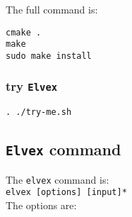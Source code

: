 \documentclass[11pt]{article}
\begin{document}
The full command is:

\begin{lstlisting}[frame=none, numbers=none]
cmake .
make
sudo make install
\end{lstlisting}

\subsubsection{try \texttt{Elvex}}

\begin{lstlisting}[frame=none, numbers=none]
. ./try-me.sh
\end{lstlisting}

\subsection{\texttt{Elvex} command}

The \texttt{elvex} command is:\\

\noindent
\verb#elvex [options] [input]*#\\

The options are:
\end{document}
